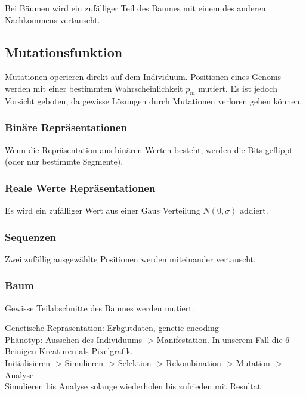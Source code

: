          Bei Bäumen wird ein zufälliger Teil des Baumes mit einem des anderen Nachkommens vertauscht.

    \subsection{Mutationsfunktion}

      Mutationen operieren direkt auf dem Individuum.
      Positionen eines Genoms werden mit einer bestimmten Wahrscheinlichkeit \(p_{m}\) mutiert.
      Es ist jedoch Vorsicht geboten, da gewisse Lösungen durch Mutationen verloren gehen können.

      \subsubsection{Binäre Repräsentationen}

        Wenn die Repräsentation aus binären Werten besteht, werden die Bits geflippt (oder nur bestimmte Segmente).

      \subsubsection{Reale Werte Repräsentationen}

        Es wird ein zufälliger Wert aus einer Gaus Verteilung \(N(0,\sigma)\) addiert.

      \subsubsection{Sequenzen}

        Zwei zufällig ausgewählte Positionen werden miteinander vertauscht.

      \subsubsection{Baum}

        Gewisse Teilabschnitte des Baumes werden mutiert.

    Genetische Repräsentation: Erbgutdaten, genetic encoding
    \\
    Phänotyp: Aussehen des Individuums -> Manifestation. In unserem Fall die 6-Beinigen Kreaturen als Pixelgrafik.
    \\
    Initialisieren -> Simulieren -> Selektion -> Rekombination -> Mutation -> Analyse
    \\
    Simulieren bis Analyse solange wiederholen bis zufrieden mit Resultat

